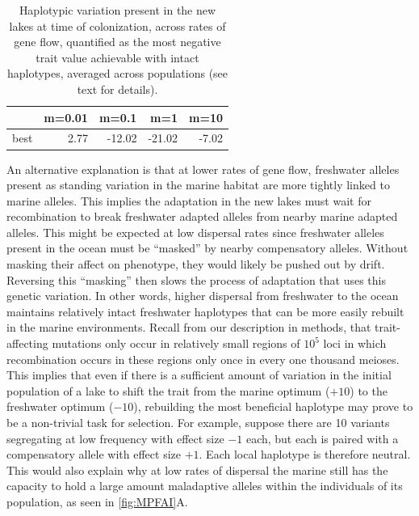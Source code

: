 \documentclass{article}
\begin{document}
\begin{table}[ht]
    \centering
    \begin{tabular}{rrrrr}
      \hline
     & m=0.01 & m=0.1 & m=1 & m=10 \\ 
      \hline
          best & 2.77 & -12.02 & -21.02 & -7.02 \\ 
       \hline
    \end{tabular}
    \caption{
        Haplotypic variation present in the new lakes at time of colonization,
        across rates of gene flow,
        quantified as the most negative trait value achievable
            with intact haplotypes, averaged across populations
            (see text for details).
    } \label{tab:linkage}
\end{table}

An alternative explanation is that at lower rates of gene flow,
freshwater alleles present as standing variation in the marine habitat
are more tightly linked to marine alleles.
This implies the adaptation in the new lakes must wait for recombination to break freshwater adapted alleles from nearby marine adapted alleles.
This might be expected at low dispersal rates since freshwater alleles present in the ocean
must be ``masked'' by nearby compensatory alleles.
Without masking their affect on phenotype, they would likely be pushed out by drift.
Reversing this ``masking'' then slows the process of adaptation that uses this genetic variation.
In other words, higher dispersal from freshwater to the ocean maintains relatively intact freshwater haplotypes
that can be more easily rebuilt in the marine environments.
Recall from our description in methods, that trait-affecting mutations only occur in relatively small regions of $10^5$ loci
in which recombination occurs in these regions only once in every one thousand meioses.
This implies that even if there is a sufficient amount of variation in the initial population of a lake
to shift the trait from the marine optimum ($+10$) to the freshwater optimum ($-10$),
rebuilding the most beneficial haplotype may prove to be a non-trivial task for selection.
For example, suppose there are 10 variants segregating at low frequency with effect size $-1$ each,
but each is paired with a compensatory allele with effect size $+1$.
Each local haplotype is therefore neutral.
This would also explain why at low rates of dispersal 
the marine still has the capacity to hold a large amount maladaptive alleles within the individuals of its population, 
as seen in \ref{fig:MPFAI}A.
\end{document}
